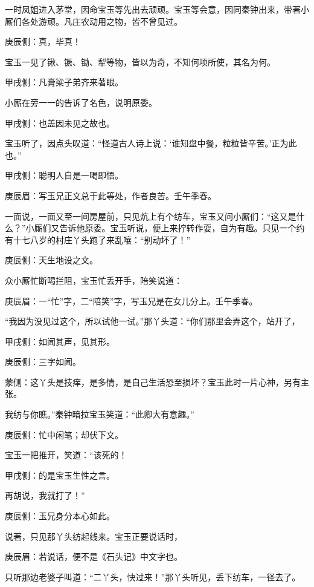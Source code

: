 \begin{parag}
    一时凤姐进入茅堂，因命宝玉等先出去顽顽。宝玉等会意，因同秦钟出来，带著小厮们各处游顽。凡庄农动用之物，皆不曾见过。\begin{note}庚辰侧：真，毕真！\end{note}宝玉一见了锹、镢、锄、犁等物，皆以为奇，不知何项所使，其名为何。\begin{note}甲戌侧：凡膏粱子弟齐来著眼。\end{note}小厮在旁一一的告诉了名色，说明原委。\begin{note}甲戌侧：也盖因未见之故也。\end{note}宝玉听了，因点头叹道：“怪道古人诗上说：‘谁知盘中餐，粒粒皆辛苦。’正为此也。”\begin{note}甲戌侧：聪明人自是一喝即悟。\end{note}\begin{note}庚辰眉：写玉兄正文总于此等处，作者良苦。壬午季春。\end{note}一面说，一面又至一间房屋前，只见炕上有个纺车，宝玉又问小厮们：“这又是什么？”小厮们又告诉他原委。宝玉听说，便上来拧转作耍，自为有趣。只见一个约有十七八岁的村庄丫头跑了来乱嚷：“别动坏了！”\begin{note}庚辰侧：天生地设之文。\end{note}众小厮忙断喝拦阻，宝玉忙丢开手，陪笑说道：\begin{note}庚辰眉：一“忙”字，二“陪笑”字，写玉兄是在女儿分上。壬午季春。\end{note}“我因为没见过这个，所以试他一试。”那丫头道：“你们那里会弄这个，站开了，\begin{note}甲戌侧：如闻其声，见其形。\end{note}\begin{note}庚辰侧：三字如闻。\end{note}\begin{note}蒙侧：这丫头是技痒，是多情，是自己生活恐至损坏？宝玉此时一片心神，另有主张。\end{note}我纺与你瞧。”秦钟暗拉宝玉笑道：“此卿大有意趣。”\begin{note}庚辰侧：忙中闲笔；却伏下文。\end{note}宝玉一把推开，笑道：“该死的！\begin{note}甲戌侧：的是宝玉生性之言。\end{note}再胡说，我就打了！”\begin{note}庚辰侧：玉兄身分本心如此。\end{note}说著，只见那丫头纺起线来。宝玉正要说话时，\begin{note}庚辰眉：若说话，便不是《石头记》中文字也。\end{note}只听那边老婆子叫道：“二丫头，快过来！”那丫头听见，丢下纺车，一径去了。
\end{parag}



